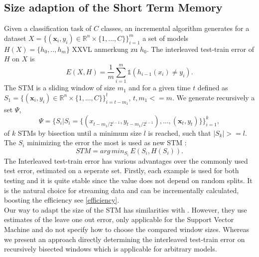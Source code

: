 \documentclass[conference]{IEEEtran}
\begin{document}
\subsection{Size adaption of the Short Term Memory}
Given a classification task of $C$ classes, an incremental algorithm generates for a dataset $X= \{ (\mathbf{x}_i,y_i) \in \mathbb{R}^n \times \{1,...,C\}\}_{i=1}^m$
a set of models $H(X)=\{h_0,..,h_{m}\}$ XXVL anmerkung zu $h_0$. The interleaved test-train error of $H$ on $X$ is 
\begin{equation*}
E(X, H) = \frac{1}{m}\sum_{i=1}^m \mathds{1} (h_{i-1}(x_i)\neq y_i).
\end{equation*}
The STM is a sliding window of size $m_1$ and for a given time $t$ defined as 
$S_1= \{ (\mathbf{x}_i,y_i) \in \mathbb{R}^n \times \{1,...,C\}\}_{i=t-m_1}^{t}$, $t, m_1<=m$.
We generate recursively a set $\Psi$, 
\begin{equation*}
\Psi=\{S_i|S_i=\{(x_{t-m_1/2^{i-1}},y_{t-m_1/2^{i-1}}),...,(\mathbf{x}_t,y_t)\}\}_{i=1}^k,
\end{equation*}
of $k$ STMs by bisection until a minimum size $l$ is reached, such that $|S_k|>=l$.
The $S_i$ minimizing the error the most is used as new STM :
\begin{equation*}
STM = arg\,min_{S_i}\,E(S_i, H(S_i)).
\end{equation*}
The Interleaved test-train error has various advantages over the commonly used test error, estimated on a seperate set. Firstly, each example is used for both testing and 
it is quite stable since the value does not depend on random splits. It is the natural choice for streaming data and can be incrementally calculated, boosting the efficiency see \ref{efficiency}.\\
Our way to adapt the size of the STM has similarities with \cite{klinkenberg2000detecting}. However, they use estimates of the leave one out error, only applicable for the Support Vector Machine
and do not specify how to choose the compared window sizes. Whereas we present an approach directly determining the interleaved test-train error on recursively bisected windows which is applicable for arbitrary models. 
\end{document}
